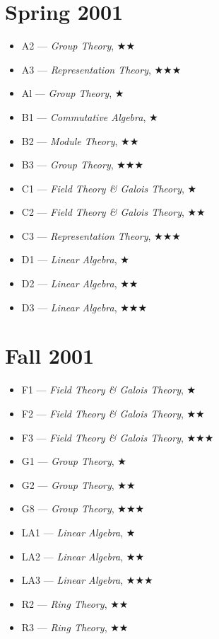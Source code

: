 \documentclass[11pt,letterpaper]{book}
\begin{document}
\section*{Spring 2001}
\begin{itemize}
\item A2 --- \textit{Group Theory}, $\bigstar\bigstar$
\item A3 --- \textit{Representation Theory}, $\bigstar\bigstar\bigstar$
\item Al --- \textit{Group Theory}, $\bigstar$
\item B1 --- \textit{Commutative Algebra}, $\bigstar$
\item B2 --- \textit{Module Theory}, $\bigstar\bigstar$
\item B3 --- \textit{Group Theory}, $\bigstar\bigstar\bigstar$
\item C1 --- \textit{Field Theory \& Galois Theory}, $\bigstar$
\item C2 --- \textit{Field Theory \& Galois Theory}, $\bigstar\bigstar$
\item C3 --- \textit{Representation Theory}, $\bigstar\bigstar\bigstar$
\item D1 --- \textit{Linear Algebra}, $\bigstar$
\item D2 --- \textit{Linear Algebra}, $\bigstar\bigstar$
\item D3 --- \textit{Linear Algebra}, $\bigstar\bigstar\bigstar$
\end{itemize}

\section*{Fall 2001}
\begin{itemize}
\item F1 --- \textit{Field Theory \& Galois Theory}, $\bigstar$
\item F2 --- \textit{Field Theory \& Galois Theory}, $\bigstar\bigstar$
\item F3 --- \textit{Field Theory \& Galois Theory}, $\bigstar\bigstar\bigstar$
\item G1 --- \textit{Group Theory}, $\bigstar$
\item G2 --- \textit{Group Theory}, $\bigstar\bigstar$
\item G8 --- \textit{Group Theory}, $\bigstar\bigstar\bigstar$
\item LA1 --- \textit{Linear Algebra}, $\bigstar$
\item LA2 --- \textit{Linear Algebra}, $\bigstar\bigstar$
\item LA3 --- \textit{Linear Algebra}, $\bigstar\bigstar\bigstar$
\item R2 --- \textit{Ring Theory}, $\bigstar\bigstar$
\item R3 --- \textit{Ring Theory}, $\bigstar\bigstar$
\end{itemize}
\end{document}

